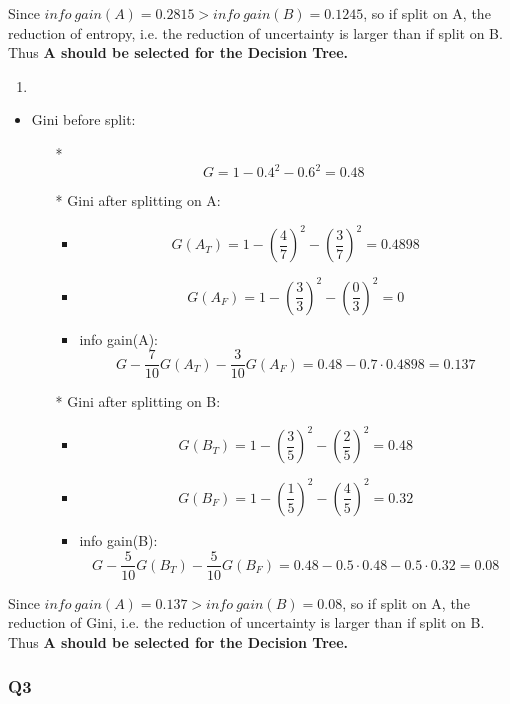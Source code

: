 \documentclass[11pt]{article}
\providecommand{\tightlist}{%
      \setlength{\itemsep}{0pt}\setlength{\parskip}{0pt}}
\begin{document}
Since \(info \: gain(A) = 0.2815 > info \: gain(B) = 0.1245\), so if
split on A, the reduction of entropy, i.e. the reduction of uncertainty
is larger than if split on B. Thus \textbf{A should be selected for the
Decision Tree.}

    \begin{enumerate}
\def\labelenumi{(\alph{enumi})}
\setcounter{enumi}{1}
\item
\end{enumerate}

\begin{itemize}
\tightlist
\item
  Gini before split:

  \begin{itemize}
  \tightlist
  \item[*]
    \[G = 1- 0.4^2 - 0.6^2 = 0.48\]
  \item[*]
    Gini after splitting on A:

    \begin{itemize}
    \tightlist
    \item
      \[G(A_T) = 1-(\frac{4}{7})^2 - (\frac{3}{7}) ^2 = 0.4898\]
    \item
      \[G(A_F) = 1 - (\frac{3}{3})^2 - (\frac{0}{3})^2 = 0 \]
    \item
      info gain(A):
      \[G - \frac{7}{10} G(A_T) - \frac{3}{10} G(A_F) = 0.48 - 0.7 \cdot 0.4898= 0.137\]
    \end{itemize}
  \item[*]
    Gini after splitting on B:

    \begin{itemize}
    \tightlist
    \item
      \[G(B_T) = 1 -(\frac{3}{5})^2 - (\frac{2}{5})^2 = 0.48\]
    \item
      \[G(B_F) = 1- (\frac{1}{5})^2 - (\frac{4}{5})^2 = 0.32\]
    \item
      info gain(B):
      \[G - \frac{5}{10} G(B_T) - \frac{5}{10} G(B_F) = 0.48 - 0.5 \cdot 0.48 - 0.5 \cdot 0.32 = 0.08\]
    \end{itemize}
  \end{itemize}
\end{itemize}

Since \(info \: gain(A) = 0.137 > info \: gain(B) = 0.08\), so if split
on A, the reduction of Gini, i.e. the reduction of uncertainty is larger
than if split on B. Thus \textbf{A should be selected for the Decision
Tree.}

    \subsubsection*{Q3}\label{q3}
\end{document}
